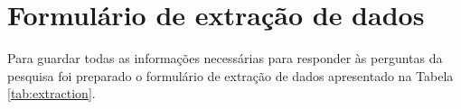 \begin{comment}
Q7. O estudo amplia suficientemente o conhecimento sobre comunicação de requisitos no processo de desenvolvimento de software?	&x	&x	&x	&x\\
 \hline	
Q8. O posicionamento sobre o tema é adequado?	&	&	&	& & x\\
 \hline	
Q9. É provável que provoque discussão sobre o tema?	&	& &  &	&x\\
 \hline	

Q10. Quão claras são as hipóteses/concepções teóricas/valores que moldaram as configurações e as opiniões descritas?	&	&	&	& & x\\
 \hline
 \end{tabular}%
 \legend{Fonte: Adaptado de \cite{vilela2017integration}.}
 \label{tab:quality}%
\end{table*}%

        A avaliação da qualidade dos artigos foi realizada por meio de uma técnica de pontuação para avaliar a credibilidade, completude e relevância dos estudos selecionados. Os artigos serão avaliados em relação a um conjunto de 10 critérios de qualidade proposto por \cite{vilela2017integration}.
        
        O trabalho diferencia os estudos em cinco categorias: artigos de avaliação (\emph{Evaluation Research Papers} - EVA); artigos de validação (\emph{Validation Research} Papers - VAL); Propostas de solução (\emph{Solution Proposal Papers} - SOL); Relatos de experiência (\emph{Experience Papers} - EXP); e artigos de opinião (\emph{Opinion Papers} - OP). %
        
        Cada critério da avaliação de qualidade possui três respostas possíveis: ``Sim'' (pontuação = 1), ``Parcialmente'' (pontuação = 0,5) ou ``Não'' (pontuação = 0). Consequentemente, o grau de qualidade de um artigo é calculado considerando a soma das pontuações das respostas para as questões relacionadas ao seu tipo de pesquisa.
\end{comment}  
   
\section{Formulário de extração de dados}
    
     Para guardar todas as informações necessárias para responder às perguntas da pesquisa foi preparado o formulário de extração de dados apresentado na Tabela \ref{tab:extraction}.
    
